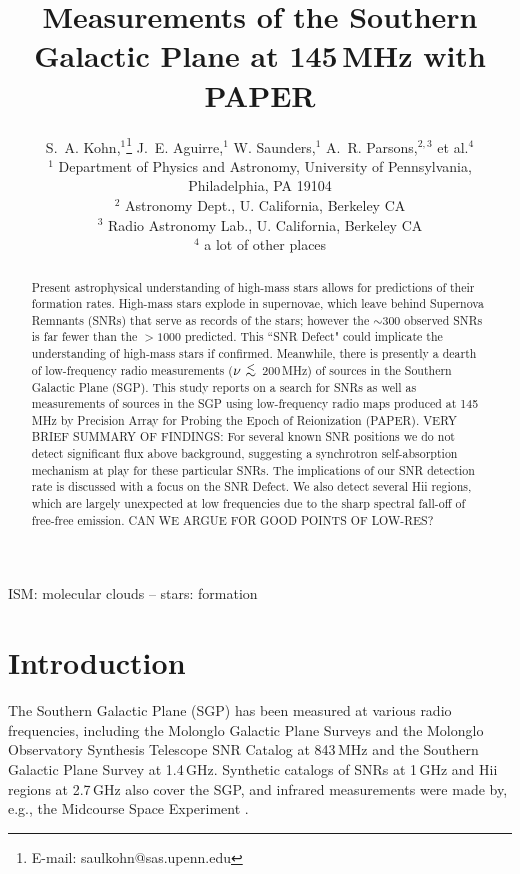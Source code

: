 \documentclass[useAMS,usenatbib]{mn2e}
\title[The SGP at 145\,MHz with PAPER]{Measurements of the Southern Galactic Plane at 145\,MHz with PAPER}
\author[S. A. Kohn et al.]{S.~A. Kohn,$^{1}$\thanks{E-mail: saulkohn@sas.upenn.edu} J.~E. Aguirre,$^{1}$ W. Saunders,$^{1}$
A.~R. Parsons,$^{2,3}$
\newauthor et al.$^4$\\
$^{1}$ Department of Physics and Astronomy, University of Pennsylvania, Philadelphia, PA 19104\\
$^{2}$ Astronomy Dept., U. California, Berkeley CA\\
$^{3}$ Radio Astronomy Lab., U. California, Berkeley CA\\
$^{4}$ a lot of other places\\
}
\newcommand {\aplt} {\ {\raise-.5ex\hbox{$\buildrel<\over\sim$}}\ }
\begin{document}
\date{}

\maketitle
\begin{abstract}
Present astrophysical understanding of high-mass stars allows for predictions of their formation rates.  High-mass stars explode in supernovae, which leave behind Supernova Remnants (SNRs) that serve as records of the stars; however the $\sim$300 observed SNRs is far fewer than the $>1000$ predicted.  This ``SNR Defect" could implicate the understanding of high-mass stars if confirmed. 
Meanwhile, there is presently a dearth of low-frequency radio measurements ($\nu\aplt$200\,MHz) of sources in the Southern Galactic Plane (SGP).
This study reports on a search for SNRs as well as measurements of sources in the SGP using low-frequency radio maps produced at 145\,MHz by Precision Array for Probing the Epoch of Reionization (PAPER).
{\color{red} VERY BRIEF SUMMARY OF FINDINGS:} For several known SNR positions we do not detect significant flux above background, suggesting a synchrotron self-absorption mechanism at play for these particular SNRs. The implications of our SNR detection rate is discussed with a focus on the SNR Defect. We also detect several H{\sc ii} regions, which are largely unexpected at low frequencies due to the sharp spectral fall-off of free-free emission.
{\color{blue} CAN WE ARGUE FOR GOOD POINTS OF LOW-RES?}
\end{abstract}

\begin{keywords}
ISM: molecular clouds -- stars: formation
\end{keywords}

\section{Introduction}

The Southern Galactic Plane (SGP) has been measured at various radio frequencies, including the Molonglo Galactic Plane Surveys \citep[MGPS-1 and 2;][]{Green.99,Murphy.07} and the Molonglo Observatory Synthesis Telescope SNR Catalog \citep[MOSTSNRCAT;][]{Whiteoak.96} at 843\,MHz and the Southern Galactic Plane Survey \citep[SGPS;][]{Haverkorn.06} at 1.4\,GHz. Synthetic catalogs of SNRs at 1\,GHz \citep{DAGreen.14} and H{\sc ii} regions at 2.7\,GHz \citep{Paladini.03} also cover the SGP, and infrared measurements were made by, e.g., the Midcourse Space Experiment \citep[MSX;][operating at 8.28--21.3\,$\mu$m (36.23--14.08\,THz)]{Egan.03}. 
\end{document}
